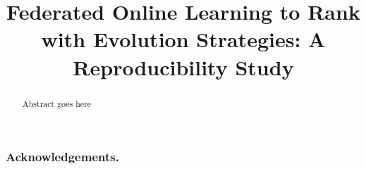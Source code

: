 \documentclass[runningheads]{llncs}
\begin{document}

\title{Federated Online Learning to Rank with Evolution Strategies: A Reproducibility Study}


%



\maketitle

\begin{abstract}
Abstract goes here
\end{abstract}











\makeatletter
\renewcommand{\@biblabel}[1]{\hfill #1.}
\makeatother

\subsubsection*{Acknowledgements.}






\end{document}
